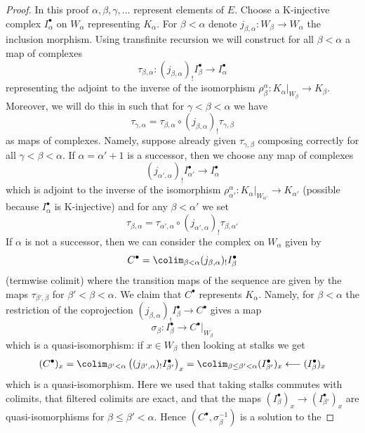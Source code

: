 \begin{proof}

In this proof $\alpha, \beta, \gamma, \ldots$ represent elements of $E$.
Choose a K-injective complex
$I_\alpha^\bullet$ on $W_\alpha$ representing $K_\alpha$.
For $\beta < \alpha$ denote $j_{\beta, \alpha} : W_\beta \to W_\alpha$
the inclusion morphism. Using transfinite recursion we will construct for all
$\beta < \alpha$ a map of complexes
$$
\tau_{\beta, \alpha} :
(j_{\beta, \alpha})_!I_\beta^\bullet
\longrightarrow
I_\alpha^\bullet
$$
representing the adjoint to the inverse of the isomorphism
$\rho^\alpha_\beta : K_\alpha|_{W_\beta} \to K_\beta$.
Moreover, we will do this in such that for
$\gamma < \beta < \alpha$ we have
$$
\tau_{\gamma, \alpha} = \tau_{\beta, \alpha} \circ
(j_{\beta, \alpha})_!\tau_{\gamma, \beta}
$$
as maps of complexes. Namely, suppose already given $\tau_{\gamma, \beta}$
composing correctly for all $\gamma < \beta < \alpha$.
If $\alpha = \alpha' + 1$ is a successor, then we choose any map of complexes
$$
(j_{\alpha', \alpha})_!I_{\alpha'}^\bullet \to I_\alpha^\bullet
$$
which is adjoint to the inverse of the isomorphism
$\rho^\alpha_{\alpha'} : K_\alpha|_{W_{\alpha'}} \to K_{\alpha'}$
(possible because $I_\alpha^\bullet$ is K-injective)
and for any $\beta < \alpha'$ we set
$$
\tau_{\beta, \alpha} = \tau_{\alpha', \alpha} \circ
(j_{\alpha', \alpha})_!\tau_{\beta, \alpha'}
$$
If $\alpha$ is not a successor, then
we can consider the complex on $W_\alpha$ given by
$$
C^\bullet = \colim_{\beta < \alpha} (j_{\beta, \alpha})_!I_\beta^\bullet
$$
(termwise colimit) where the transition maps of the sequence
are given by the maps $\tau_{\beta', \beta}$ for
$\beta' < \beta < \alpha$. We claim that $C^\bullet$
represents $K_\alpha$. Namely, for $\beta < \alpha$ the restriction
of the coprojection $(j_{\beta, \alpha})_!I_\beta^\bullet \to C^\bullet$
gives a map
$$
\sigma_\beta : I_\beta^\bullet \longrightarrow C^\bullet|_{W_\beta}
$$
which is a quasi-isomorphism: if $x \in W_\beta$ then looking
at stalks we get
$$
(C^\bullet)_x =
\colim_{\beta' < \alpha}
\left((j_{\beta', \alpha})_!I_{\beta'}^\bullet\right)_x =
\colim_{\beta \leq \beta' < \alpha} (I_{\beta'}^\bullet)_x
\longleftarrow
(I_\beta^\bullet)_x
$$
which is a quasi-isomorphism. Here we used that taking stalks
commutes with colimits, that filtered colimits are exact, and
that the maps $(I_\beta^\bullet)_x \to (I_{\beta'}^\bullet)_x$
are quasi-isomorphisms for $\beta \leq \beta' < \alpha$.
Hence $(C^\bullet, \sigma_\beta^{-1})$ is a solution to the

\end{proof}
